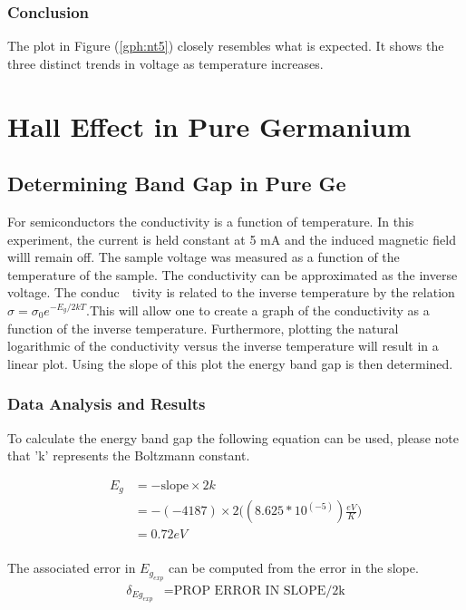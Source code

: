 \documentclass[a4paper]{article}
\begin{document}
\subsubsection{Conclusion}
\qq The plot in Figure (\ref{gph:nt5}) closely resembles what is expected. It
shows the three distinct trends in voltage as temperature increases.

\newpage

\section{Hall Effect in Pure Germanium}

\subsection{Determining Band Gap in Pure Ge}

\qq For semiconductors the conductivity is a function of
temperature. In this experiment, the current is held constant at 5 mA
and the induced magnetic field willl remain off. The sample voltage
was measured as a function of the temperature of the sample. The
conductivity can be approximated as the inverse voltage. The
conduc\ \ tivity is related to the inverse temperature by the relation
$\sigma = \sigma_0 e^{-E_g/2kT}$.This will allow one to create a graph
of the conductivity as a function of the inverse
temperature. Furthermore, plotting the natural logarithmic of the
conductivity versus the inverse temperature will result in a linear
plot. Using the slope of this plot the energy band gap is then
determined.

\subsubsection{Data Analysis and Results}
\qq To calculate the energy band gap the following equation can be
used, please note that 'k' represents the Boltzmann constant.

\begin{align*}
E_g &= - \text{slope} \times 2k \\
    &= - (-4187) \times 2
       \Big(( 8.625 * 10^(-5)) \frac{eV}{K} \Big) \\
    &= 0.72 eV \\
\end{align*}



The associated error in $E_{g_{exp}}$ can be computed from the error in the slope.
\begin{align*}
\delta_{Eg_{exp}} &= \text{PROP ERROR IN SLOPE/2k} \\
\end{align*}
\end{document}
